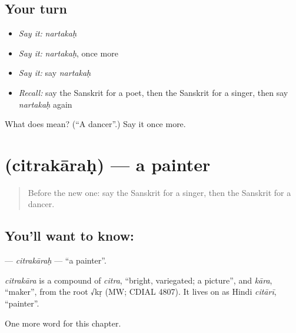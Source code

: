 \subsection*{Your turn}
\begin{itemize}
\raggedright
  \item \emph{Say it:} \emph{nartakaḥ}
  \item \emph{Say it:} \emph{nartakaḥ}, once more
  \item \emph{Say it:} say \emph{nartakaḥ}
  \item \emph{Recall:} say the Sanskrit for a poet, then the Sanskrit for a singer, then say \emph{nartakaḥ} again
\end{itemize}

\begin{tcolorbox}[breakable,colback=teal!4,colframe=teal!35!black,title={Before you move on}]
What does  mean? (\textquotedblleft{}A dancer\textquotedblright{}.) Say it once more.
\end{tcolorbox}
\section[\texorpdfstring{\sk{चित्रकारः} (citrakāraḥ)}{चित्रकारः (citrakāraḥ)}]{ (citrakāraḥ) — a painter}

\label{lesson:SA-C209-citrakarah}



\begin{quote}
Before the new one: say the Sanskrit for a singer, then the Sanskrit for a dancer.
\end{quote}

\subsection*{You'll want to know: }
\textbf{} — \emph{citrakāraḥ} — \textquotedblleft{}a painter\textquotedblright{}.

\begin{cousinweb}
\emph{citrakāra} is a compound of \emph{citra}, \textquotedblleft{}bright, variegated; a picture\textquotedblright{}, and \emph{kāra}, \textquotedblleft{}maker\textquotedblright{}, from the root √kṛ (MW; CDIAL 4807). It lives on as Hindi \emph{citārī}, \textquotedblleft{}painter\textquotedblright{}.
\end{cousinweb}

\begin{grammarlens}[title={What you've built}]
One more word for this chapter.
\end{grammarlens}

